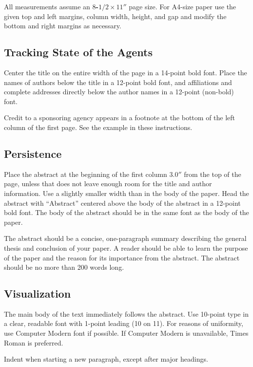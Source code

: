 \documentclass{article}
\begin{document}
All measurements assume an {\bf $8$-$1/2 \times 11''$} page size.  
For A4-size paper use the given top and left margins, column width,
height, and gap and modify the bottom and right margins as necessary.

\subsection{Tracking State of the Agents}

Center the title on the entire width of the page in a 14-point bold font.
Place the names of authors below the title in a 12-point bold font, and
affiliations and complete addresses directly below the author names in a
12-point (non-bold) font.

Credit to a sponsoring agency appears in a footnote at the bottom of the
left column of the first page.  See the example in these instructions.

\subsection{Persistence}

Place the abstract at the beginning of the first column $3.0''$ from the
top of the page, unless that does not leave enough room for the title and
author information.  Use a slightly smaller width than in the body of the
paper.  Head the abstract with ``Abstract'' centered above the body of the
abstract in a 12-point bold font.  The body of the abstract should be in
the same font as the body of the paper.

The abstract should be a concise, one-paragraph summary
describing the general thesis and conclusion of your
paper. A reader should be able to learn the purpose of the
paper and the reason for its importance from the abstract. The
abstract should be no more than 200 words long.

\subsection{Visualization}

The main body of the text immediately follows the abstract. 
Use 10-point type in a clear, readable font with 1-point leading (10 on
11).  For reasons of uniformity, use Computer Modern font if possible.  If
Computer Modern is unavailable, Times Roman is preferred.

Indent when starting a new paragraph, except after major headings.
\end{document}
